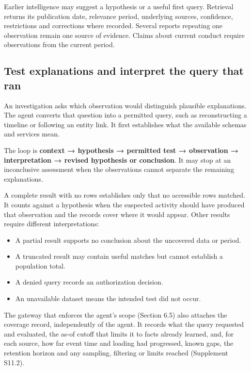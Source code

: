 \documentclass[acmlarge,nonacm]{acmart}
\providecommand{\tightlist}{\setlength{\itemsep}{0pt}\setlength{\parskip}{0pt}}
\begin{document}
Earlier intelligence may suggest a hypothesis or a useful first query.
Retrieval returns its publication date, relevance period, underlying
sources, confidence, restrictions and corrections where recorded.
Several reports repeating one observation remain one source of evidence.
Claims about current conduct require observations from the current
period.

\hypertarget{test-explanations-and-interpret-the-query-that-ran}{%
\subsection{Test explanations and interpret the query that
ran}\label{test-explanations-and-interpret-the-query-that-ran}}

An investigation asks which observation would distinguish plausible
explanations. The agent converts that question into a permitted query,
such as reconstructing a timeline or following an entity link. It first
establishes what the available schemas and services mean.

The loop is \textbf{context → hypothesis → permitted test → observation
→ interpretation → revised hypothesis or conclusion}. It may stop at an
inconclusive assessment when the observations cannot separate the
remaining explanations.

A complete result with no rows establishes only that no accessible rows
matched. It counts against a hypothesis when the suspected activity
should have produced that observation and the records cover where it
would appear. Other results require different interpretations:

\begin{itemize}
\tightlist
\item
  A partial result supports no conclusion about the uncovered data or
  period.
\item
  A truncated result may contain useful matches but cannot establish a
  population total.
\item
  A denied query records an authorization decision.
\item
  An unavailable dataset means the intended test did not occur.
\end{itemize}

The gateway that enforces the agent's scope (Section 6.5) also attaches
the coverage record, independently of the agent. It records what the
query requested and evaluated, the as-of cutoff that limits it to facts
already learned, and, for each source, how far event time and loading
had progressed, known gaps, the retention horizon and any sampling,
filtering or limits reached (Supplement S11.2).
\end{document}
